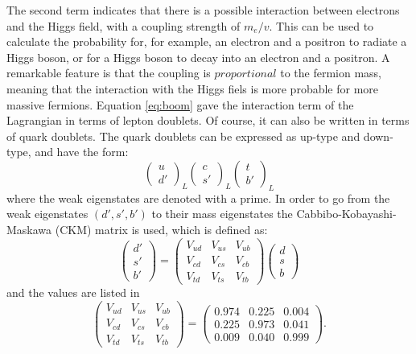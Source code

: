The second term indicates that there is a possible interaction between electrons and the Higgs field, with a coupling strength of $m_{e}/v$. 
This can be used to calculate the probability for, for example, an electron and a positron to radiate a Higgs boson, or for a Higgs boson to decay into an electron and a positron. 
A remarkable feature is that the coupling is $proportional$ to the fermion mass, meaning that the interaction with the Higgs fiels is more probable for more massive fermions. 
\newpara
\noindent\justify
Equation \ref{eq:boom} gave the interaction term of the Lagrangian in terms of lepton doublets. 
Of course, it can also be written in terms of quark doublets. 
The quark doublets can be expressed as up-type and down-type, and have the form:
\begin{equation}
\begin{pmatrix} u \\ d'\end{pmatrix}_{L}\begin{pmatrix} c \\ s'\end{pmatrix}_{L} \begin{pmatrix} t \\ b'\end{pmatrix}_{L} 
\end{equation}
where the weak eigenstates are denoted with a prime. 
In order to go from the weak eigenstates $(d',s',b')$ to their mass eigenstates the Cabbibo-Kobayashi-Maskawa (CKM) matrix is used, which is defined as:
\begin{equation}
\begin{pmatrix} d' \\ s' \\ b'\end{pmatrix} = \begin{pmatrix} V_{ud} & V_{us} & V_{ub} \\ V_{cd} & V_{cs} & V_{cb} \\ V_{td} & V_{ts} & V_{tb} \end{pmatrix}\begin{pmatrix} d \\ s \\ b\end{pmatrix}
\end{equation}
and the values are listed in 
\begin{equation}
\begin{pmatrix} V_{ud} & V_{us} & V_{ub} \\ V_{cd} & V_{cs} & V_{cb} \\ V_{td} & V_{ts} & V_{tb} \end{pmatrix} =\begin{pmatrix} 0.974 & 0.225 & 0.004 \\ 0.225 & 0.973 & 0.041 \\ 0.009 & 0.040 & 0.999 \end{pmatrix}.
\end{equation}
